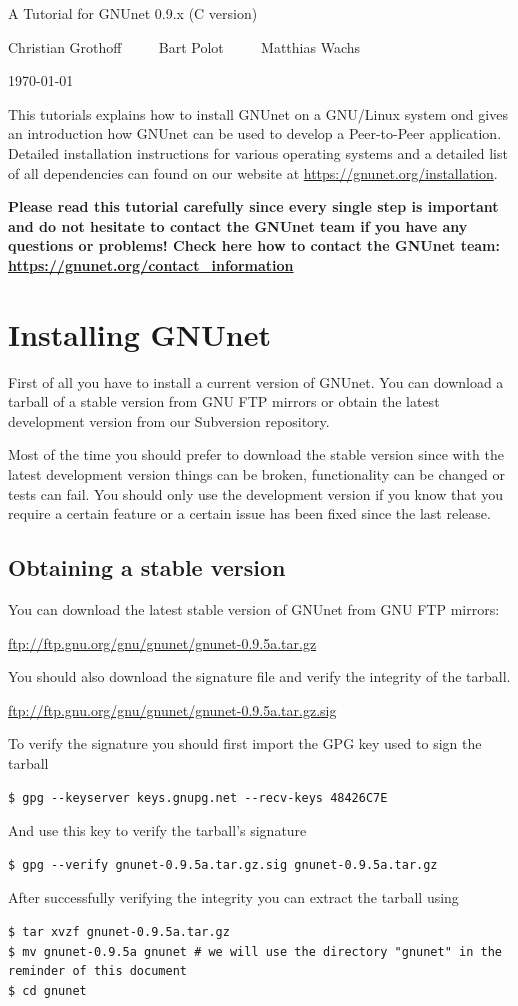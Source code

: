 \documentclass[10pt]{article}
\begin{document}
\begin{center}
\large {A Tutorial for GNUnet 0.9.x (C version)}

Christian Grothoff $\qquad$ Bart Polot $\qquad$ Matthias Wachs

\today
\end{center}
This tutorials explains how to install GNUnet on a GNU/Linux system ond gives an introduction how 
GNUnet can be used to develop a Peer-to-Peer application. Detailed installation instructions for 
various operating systems and a detailed list of all dependencies can found on our website at 
\url{https://gnunet.org/installation}. 

\textbf{Please read this tutorial carefully since every single step is important and do not hesitate to contact the GNUnet team if you have any questions or problems! Check here how to contact the GNUnet team:
\url{https://gnunet.org/contact_information}}


\section{Installing GNUnet}
First of all you have to install a current version of GNUnet. You can download a 
tarball of a stable version from GNU FTP mirrors or obtain the latest development 
version from our Subversion repository.

Most of the time you should prefer to download the stable version since with the 
latest development version things can be broken, functionality can be changed or tests 
can fail. You should only use the development version if you know that you require a 
certain feature or a certain issue has been fixed since the last release.

\subsection{Obtaining a stable version}
You can download the latest stable version of GNUnet from GNU FTP mirrors:
\begin{center}
\url{ftp://ftp.gnu.org/gnu/gnunet/gnunet-0.9.5a.tar.gz}
\end{center}
You should also download the signature file and verify the integrity of the tarball.
\begin{center}
\url{ftp://ftp.gnu.org/gnu/gnunet/gnunet-0.9.5a.tar.gz.sig}
\end{center}
To verify the signature you should first import the GPG key used to sign the tarball
\begin{lstlisting}
$ gpg --keyserver keys.gnupg.net --recv-keys 48426C7E
\end{lstlisting}
And use this key to verify the tarball's signature
\begin{lstlisting}
$ gpg --verify gnunet-0.9.5a.tar.gz.sig gnunet-0.9.5a.tar.gz
\end{lstlisting}
After successfully verifying the integrity you can extract the tarball using
\begin{lstlisting}
$ tar xvzf gnunet-0.9.5a.tar.gz
$ mv gnunet-0.9.5a gnunet # we will use the directory "gnunet" in the reminder of this document
$ cd gnunet
\end{lstlisting}
\end{document}
